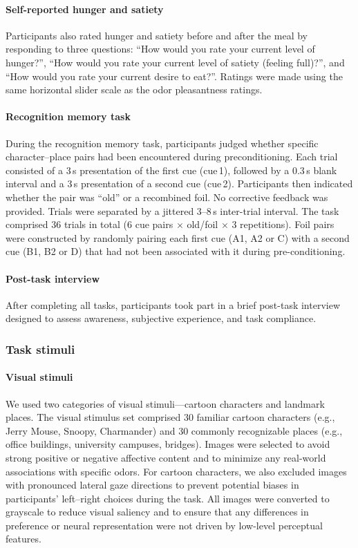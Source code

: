 \documentclass[9pt,twoside,lineno]{pnas-new}
\begin{document}
\paragraph*{Self-reported hunger and satiety}

Participants also rated hunger and satiety before and after the meal by responding to three questions: “How would you rate your current level of hunger?”, “How would you rate your current level of satiety (feeling full)?”, and “How would you rate your current desire to eat?”. Ratings were made using the same horizontal slider scale as the odor pleasantness ratings.

\paragraph*{Recognition memory task}

During the recognition memory task, participants judged whether specific character--place pairs had been encountered during preconditioning. Each trial consisted of a 3\,s presentation of the first cue (cue\,1), followed by a 0.3\,s blank interval and a 3\,s presentation of a second cue (cue\,2). Participants then indicated whether the pair was ``old'' or a recombined foil. No corrective feedback was provided. Trials were separated by a jittered 3--8\,s inter-trial interval. The task comprised 36 trials in total (6 cue pairs $\times$ old/foil $\times$ 3 repetitions). Foil pairs were constructed by randomly pairing each first cue (A1, A2 or C) with a second cue (B1, B2 or D) that had not been associated with it during pre-conditioning.

\paragraph*{Post-task interview}

After completing all tasks, participants took part in a brief post-task interview designed to assess awareness, subjective experience, and task compliance.

\subsubsection*{Task stimuli}

\paragraph*{Visual stimuli}

We used two categories of visual stimuli—cartoon characters and landmark places. The visual stimulus set comprised 30 familiar cartoon characters (e.g., Jerry Mouse, Snoopy, Charmander) and 30 commonly recognizable places (e.g., office buildings, university campuses, bridges). Images were selected to avoid strong positive or negative affective content and to minimize any real-world associations with specific odors. For cartoon characters, we also excluded images with pronounced lateral gaze directions to prevent potential biases in participants’ left–right choices during the task. All images were converted to grayscale to reduce visual saliency and to ensure that any differences in preference or neural representation were not driven by low-level perceptual features.
\end{document}
